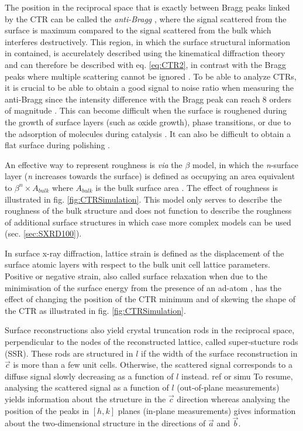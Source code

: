 The position in the reciprocal space that is exactly between Bragg peaks linked by the CTR can be called the \textit{anti-Bragg} \parencite{Robinson1991}, where the signal scattered from the surface is maximum compared to the signal scattered from the bulk which interferes destructively.
This region, in which the surface structural information in contained, is accurelately described using the kinematical diffraction theory and can therefore be described with eq. \ref{eq:CTR2}, in contrast with the Bragg peaks where multiple scattering cannot be ignored \parencite{Kaganer2007}.
To be able to analyze CTRs, it is crucial to be able to obtain a good signal to noise ratio when measuring the anti-Bragg since the intensity difference with the Bragg peak can reach 8 orders of magnitude \parencite{Fadenberger2010InSO}.
This can become difficult when the surface is roughened during the growth of surface layers (such as oxide growth), phase transitions, or due to the adsorption of molecules during catalysis \parencite{Zhdanov1997, Zhdanov1998}.
It can also be difficult to obtain a flat surface during polishing \parencite{MUSKET1982143}.

An effective way to represent roughness is \textit{via} the $\beta$ model, in which the \textit{n}-surface layer (\textit{n} increases towards the surface) is defined as occupying an area equivalent to $\beta^n \times A_{bulk}$ where $A_{bulk}$ is the bulk surface area \parencite{Robinson1986}.
The effect of roughness is illustrated in fig. \ref{fig:CTRSimulation}.
This model only serves to describe the roughness of the bulk structure and does not function to describe the roughness of additional surface structures in which case more complex models can be used (sec. \ref{sec:SXRD100}).

In surface x-ray diffraction, lattice strain is defined as the displacement of the surface atomic layers with respect to the bulk unit cell lattice parameters.
Positive or negative strain, also called surface relaxation when due to the minimisation of the surface energy from the presence of an ad-atom \parencite{Gupta1981}, has the effect of changing the position of the CTR minimum and of skewing the shape of the CTR as illustrated in fig. \ref{fig:CTRSimulation}.

Surface reconstructions also yield crystal truncation rods in the reciprocal space, perpendicular to the nodes of the reconstructed lattice, called super-stucture rods (SSR).
These rods are structured in $l$ if the width of the surface reconstruction in $\vec{c}$ is more than a few unit cells.
Otherwise, the scattered signal corresponds to a diffuse signal slowly decreasing as a function of $l$ instead.
\textcolor{Important}{ref or simu}
To resume, analysing the scattered signal as a function of $l$ (out-of-plane measurements) yields information about the structure in the $\vec{c}$ direction whereas analysing the position of the peaks in $[h, k]$ planes (in-plane measurements) gives information about the two-dimensional structure in the directions of $\vec{a}$ and $\vec{b}$.

